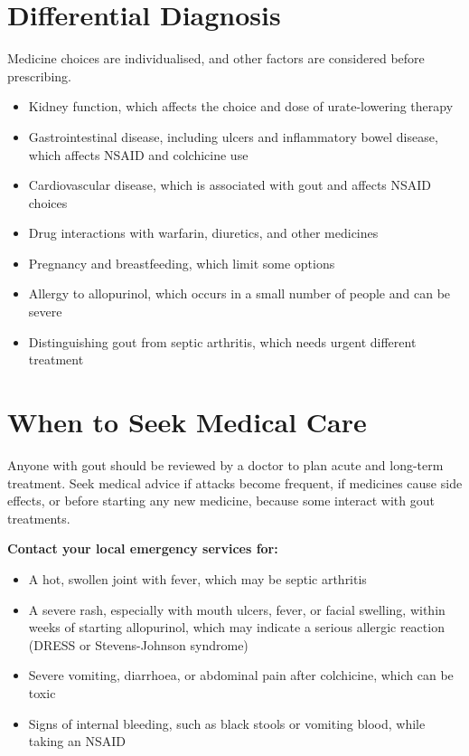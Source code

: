 \section*{Differential Diagnosis}
Medicine choices are individualised, and other factors are considered before prescribing.

\begin{itemize}
    \item Kidney function, which affects the choice and dose of urate-lowering therapy
    \item Gastrointestinal disease, including ulcers and inflammatory bowel disease, which affects NSAID and colchicine use
    \item Cardiovascular disease, which is associated with gout and affects NSAID choices
    \item Drug interactions with warfarin, diuretics, and other medicines
    \item Pregnancy and breastfeeding, which limit some options
    \item Allergy to allopurinol, which occurs in a small number of people and can be severe
    \item Distinguishing gout from septic arthritis, which needs urgent different treatment
\end{itemize}

\section*{When to Seek Medical Care}
Anyone with gout should be reviewed by a doctor to plan acute and long-term treatment. Seek medical advice if attacks become frequent, if medicines cause side effects, or before starting any new medicine, because some interact with gout treatments.

\textbf{Contact your local emergency services for:}
\begin{itemize}
    \item A hot, swollen joint with fever, which may be septic arthritis
    \item A severe rash, especially with mouth ulcers, fever, or facial swelling, within weeks of starting allopurinol, which may indicate a serious allergic reaction (DRESS or Stevens-Johnson syndrome)
    \item Severe vomiting, diarrhoea, or abdominal pain after colchicine, which can be toxic
    \item Signs of internal bleeding, such as black stools or vomiting blood, while taking an NSAID
\end{itemize}

